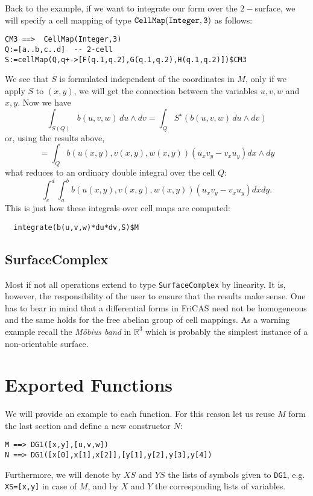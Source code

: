 \documentclass[12pt,a4paper]{article}
\newcommand{\RR}[1]{\mathbb{R}^{#1}}
\begin{document}
Back to the example, if we want to integrate our form over the $2-$surface,
we will specify a cell mapping of type $\tt CellMap(Integer,3)$ as
follows:
\begin{lstlisting}
CM3 ==>  CellMap(Integer,3)
Q:=[a..b,c..d]  -- 2-cell
S:=cellMap(Q,q+->[F(q.1,q.2),G(q.1,q.2),H(q.1,q.2)])$CM3
\end{lstlisting}
We see that $S$ is formulated independent of the coordinates in $M$,
only if we apply $S$ to $(x,y)$, we will get the connection between
the variables $u,v,w$ and $x,y$. Now we have 
\begin{displaymath}
   \int_{S(Q)} b(u,v,w)\,du\wedge dv = \int_{Q} S^{\star}(b(u,v,w)\,du\wedge dv)
\end{displaymath}
or, using the results above,
\begin{displaymath}
   = \int_{Q} b(u(x,y),v(x,y),w(x,y))  (u_x v_y - v_x u_y) dx\wedge dy
\end{displaymath}
what reduces to an ordinary double integral over the cell $Q$:
\begin{displaymath}
\int_c^d \int_a^b b(u(x,y),v(x,y),w(x,y))  (u_x v_y - v_x u_y) dx dy.
\end{displaymath}
This is just how these integrals over cell maps are computed:
\begin{lstlisting}
  integrate(b(u,v,w)*du*dv,S)$M
\end{lstlisting}
%
\subsection{SurfaceComplex}
Most if not all operations extend to type {\tt SurfaceComplex} by
linearity. It is, however, the responsibility of the user to ensure
that the results make sense. One has to bear in mind that a differential
forms in FriCAS need not be homogeneous and the same holds for the free
abelian group of cell mappings. As a warning example recall 
the {\em M\"obius band} in $\RR 3$ which is probably the simplest
instance of a non-orientable surface.  
%
\section{Exported Functions}
We will provide an example to each function. For this reason let us reuse
$M$ form the last section and define a new constructor $N$: 
\begin{lstlisting}
M ==> DG1([x,y],[u,v,w])
N ==> DG1([x[0],x[1],x[2]],[y[1],y[2],y[3],y[4])
\end{lstlisting}
Furthermore, we will denote by $XS$ and $YS$ the lists of symbols
given to {\tt DG1}, e.g. {\tt XS=[x,y]} in case of $M$, and by
$X$ and $Y$ the corresponding lists of variables.
%
\end{document}
